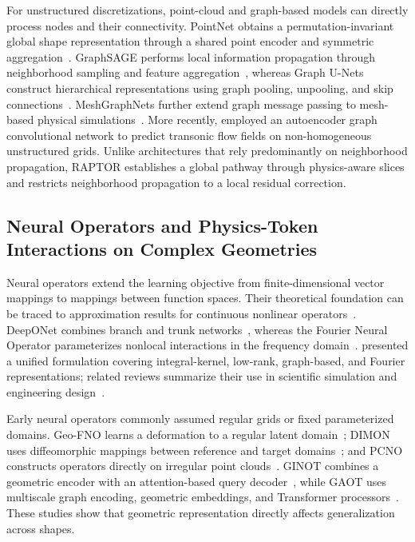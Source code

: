 \documentclass[a4paper,fleqn]{cas-sc}
\begin{document}
For unstructured discretizations, point-cloud and graph-based models can directly process nodes and their connectivity. PointNet obtains a permutation-invariant global shape representation through a shared point encoder and symmetric aggregation~\citep{ref11}. GraphSAGE performs local information propagation through neighborhood sampling and feature aggregation~\citep{ref12}, whereas Graph U-Nets construct hierarchical representations using graph pooling, unpooling, and skip connections~\citep{ref13}. MeshGraphNets further extend graph message passing to mesh-based physical simulations~\citep{ref14}. More recently, \citet{ref15} employed an autoencoder graph convolutional network to predict transonic flow fields on non-homogeneous unstructured grids. Unlike architectures that rely predominantly on neighborhood propagation, RAPTOR establishes a global pathway through physics-aware slices and restricts neighborhood propagation to a local residual correction.

\subsection{Neural Operators and Physics-Token Interactions on Complex Geometries}
\label{subsec:operator_tokens}

Neural operators extend the learning objective from finite-dimensional vector mappings to mappings between function spaces. Their theoretical foundation can be traced to approximation results for continuous nonlinear operators~\citep{ref06}. DeepONet combines branch and trunk networks~\citep{ref07}, whereas the Fourier Neural Operator parameterizes nonlocal interactions in the frequency domain~\citep{ref08}. \citet{ref09} presented a unified formulation covering integral-kernel, low-rank, graph-based, and Fourier representations; related reviews summarize their use in scientific simulation and engineering design~\citep{ref10}.

Early neural operators commonly assumed regular grids or fixed parameterized domains. Geo-FNO learns a deformation to a regular latent domain~\citep{ref16}; DIMON uses diffeomorphic mappings between reference and target domains~\citep{ref17}; and PCNO constructs operators directly on irregular point clouds~\citep{ref18}. GINOT combines a geometric encoder with an attention-based query decoder~\citep{ref33}, while GAOT uses multiscale graph encoding, geometric embeddings, and Transformer processors~\citep{ref27}. These studies show that geometric representation directly affects generalization across shapes.
\end{document}
